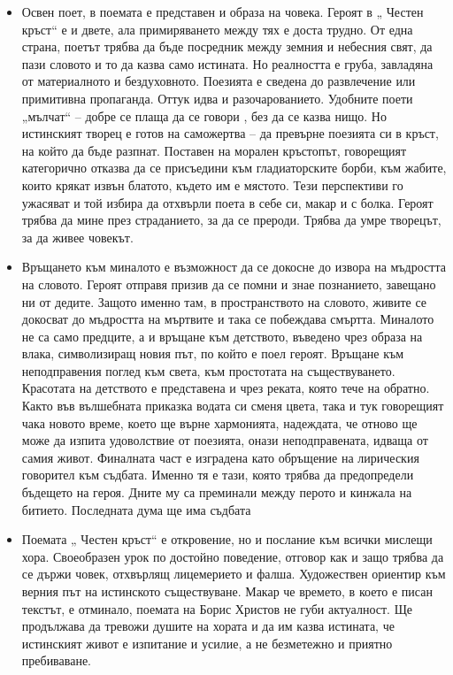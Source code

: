 \documentclass[12pt,a4paper]{article}
\begin{document}
\begin{itemize}[leftmargin=*]
\vspace{-0.6cm}
\item Освен поет, в поемата е представен и образа на човека.  Героят в „ Честен кръст“ е и двете, ала примиряването между тях е доста трудно. От една страна, поетът трябва да бъде посредник между земния и небесния свят, да пази словото и то да казва само истината.  Но реалността е груба, завладяна от материалното и бездуховното. Поезията е сведена до развлечение или примитивна пропаганда. Оттук идва и разочарованието. Удобните поети „мълчат“ – добре се плаща да се говори , без да се казва нищо.  Но истинският творец е готов на саможертва – да превърне поезията си в кръст, на който да бъде разпнат. Поставен на морален кръстопът, говорещият категорично отказва да се присъедини към гладиаторските борби, към жабите, които крякат извън блатото, където им е мястото.  Тези перспективи го ужасяват и той избира да отхвърли поета в себе си, макар и с болка.
Героят трябва да мине през страданието, за да се прероди. Трябва да умре творецът, за да живее човекът. 
\end{itemize}

\begin{itemize}[leftmargin=*]
\vspace{-0.6cm}
\item Връщането към миналото е възможност да се докосне до извора на мъдростта на словото. Героят отправя призив да се помни и знае познанието, завещано ни от дедите. Защото именно там, в пространството на словото, живите се докосват до мъдростта на мъртвите и така се побеждава смъртта. 
Миналото не са само предците, а и връщане към детството, въведено чрез образа на влака, символизиращ новия път, по който е поел героят. Връщане към неподправения поглед към света, към простотата на съществуването. Красотата на детството е представена и чрез реката, която тече на обратно. Както във вълшебната приказка водата си сменя цвета, така и тук говорещият чака новото време, което ще върне хармонията, надеждата, че отново ще може да изпита удоволствие от поезията, онази неподправената, идваща от самия живот.
Финалната част е изградена като обръщение на лирическия говорител към съдбата. Именно тя е тази, която трябва да предопредели бъдещето на героя. Дните му са преминали между перото и кинжала на битието. Последната дума ще има съдбата
\end{itemize}

\begin{itemize}[leftmargin=*]
\vspace{-0.6cm}
\item Поемата „ Честен кръст“ е откровение, но и послание към всички мислещи хора.  Своеобразен урок по достойно поведение, отговор как и защо трябва да се държи човек, отхвърлящ лицемерието и фалша. Художествен ориентир към верния път на истинското съществуване. Макар че времето, в което е писан текстът, е отминало, поемата на Борис Христов не губи актуалност. Ще продължава да тревожи душите на хората и да им казва истината, че истинският живот е изпитание и усилие, а не безметежно и приятно пребиваване.
\end{itemize}
\end{document}
